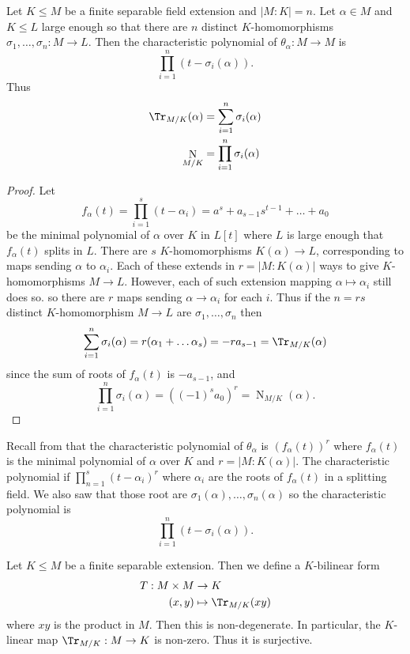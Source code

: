 \documentclass[a4paper]{article}
\DeclareMathOperator{\n}{N}
\begin{document}
\begin{theorem}
  \label{thm:trace and norm of separable extension}
  Let \(K \leq M\) be a finite separable field extension and \(|M:K| = n\). Let \(\alpha \in M\) and \(K \leq L\) large enough so that there are \(n\) distinct \(K\)-homomorphisms \(\sigma_1, \dots, \sigma_n: M \to L\). Then the characteristic polynomial of \(\theta_\alpha: M \to M\) is
  \[
    \prod_{i = 1}^{n}(t - \sigma_i(\alpha)).
  \]
  Thus
  \begin{align*}
    \Tr_{M/K}(\alpha) &= \sum_{i = 1}^{n} \sigma_i(\alpha) \\
    \n_{M/K} &= \prod_{i = 1}^{n} \sigma_i(\alpha)
  \end{align*}
\end{theorem}

\begin{proof}
  Let
  \[
    f_\alpha(t) = \prod_{i = 1}^{s} (t - \alpha_i) = a^s + a_{s - 1}s^{t - 1} + \dots + a_0
  \]
  be the minimal polynomial of \(\alpha\) over \(K\) in \(L[t]\) where \(L\) is large enough that \(f_\alpha(t)\) splits in \(L\). There are \(s\) \(K\)-homomorphisms \(K(\alpha) \to L\), corresponding to maps sending \(\alpha\) to \(\alpha_i\). Each of these extends in \(r = |M:K(\alpha)|\) ways to give \(K\)-homomorphisms \(M \to L\). However, each of such extension mapping \(\alpha \mapsto \alpha_i\) still does so. so there are \(r\) maps sending \(\alpha \to \alpha_i\) for each \(i\). Thus if the \(n = rs\) distinct \(K\)-homomorphism \(M \to L\) are \(\sigma_1, \dots, \sigma_n\) then
  \[
    \sum_{i = 1}^{n} \sigma_i(\alpha) = r(\alpha_1 + \dots \alpha_s) = -ra_{s - 1} = \Tr_{M/K} (\alpha)
  \]
  since the sum of roots of \(f_\alpha(t)\) is \(-a_{s - 1}\), and
  \[
    \prod_{i = 1}^{n} \sigma_i(\alpha) = ((-1)^s a_0)^r = \n_{M/K}(\alpha).
  \]
\end{proof}

%
%
%
%
%
Recall from  that the characteristic polynomial of \(\theta_\alpha\) is \((f_\alpha(t))^r\) where \(f_\alpha(t)\) is the minimal polynomial of \(\alpha\) over \(K\) and \(r = |M:K(\alpha)|\). The characteristic polynomial if \(\prod_{n = 1}^{s} (t - \alpha_i)^r\) where \(\alpha_i\) are the roots of \(f_\alpha(t)\) in a splitting field. We also saw that those root are \(\sigma_1(\alpha), \dots, \sigma_n(\alpha)\) so the characteristic polynomial is
\[
  \prod_{i = 1}^{n} (t - \sigma_i(\alpha)).
\]

\begin{theorem}
  \label{thm:vandermonde}
  Let \(K \leq M\) be a finite separable extension. Then we define a \(K\)-bilinear form
  \begin{align*}
    T: M \times M &\to K \\
    (x, y) &\mapsto \Tr_{M/K}(xy)
  \end{align*}
  where \(xy\) is the product in \(M\). Then this is non-degenerate. In particular, the \(K\)-linear map \(\Tr_{M/K}: M \to K\) is non-zero. Thus it is surjective.
\end{theorem}
\end{document}
